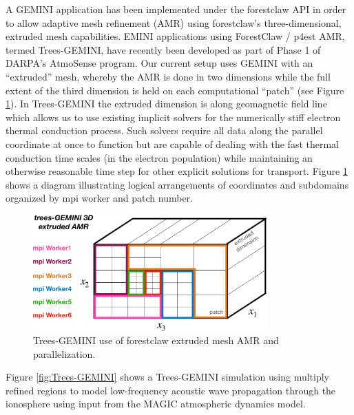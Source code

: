 \documentclass[11pt,letterpaper]{article}
\begin{document}
A GEMINI application has been implemented under the forestclaw API in order to allow adaptive mesh refinement (AMR) using forestclaw's three-dimensional, extruded mesh capabilities.  EMINI applications using ForestClaw / p4est AMR, termed Trees-GEMINI, have recently been developed as part of Phase 1 of DARPA's AtmoSense program.  Our current setup uses GEMINI with an ``extruded'' mesh, whereby the AMR is done in two dimensions while the full extent of the third dimension is held on each computational ``patch'' (see Figure \ref{fig:parallel}).  In Trees-GEMINI the extruded dimension is along geomagnetic field line which allows us to use existing implicit solvers for the numerically stiff electron thermal conduction process.  Such solvers require all data along the parallel coordinate at once to function but are capable of dealing with the fast thermal conduction time scales (in the electron population) while maintaining an otherwise reasonable time step for other explicit solutions for transport.  Figure \ref{fig:parallel} shows a diagram illustrating logical arrangements of coordinates and subdomains organized by mpi worker and patch number.  
\begin{figure}
  \centering
  \includegraphics[width=0.8\textwidth]{./figures/GEMINI_parallel-crop.pdf}
  \caption{Trees-GEMINI use of forestclaw extruded mesh AMR and parallelization.}
  \label{fig:parallel}
\end{figure}

Figure \ref{fig:Trees-GEMINI} shows a Trees-GEMINI simulation using multiply refined regions to model low-frequency acoustic wave propagation through the ionosphere using input from the MAGIC atmospheric dynamics model.  
\end{document}
